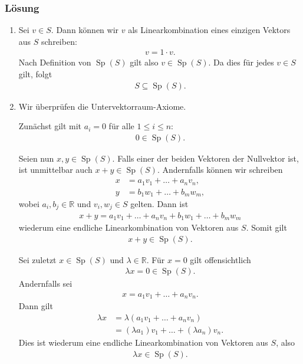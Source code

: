 \documentclass[a4paper,10pt]{article}
\newcommand{\R}{\mathbb{R}}
\newcommand{\Sp}{\operatorname{Sp}}
\newcommand{\s}[1]{#1}
\begin{document}
\s{\subsubsection*{Lösung}

\begin{enumerate}[label=(\alph*)]

    \item
    Sei $v\in S$. Dann können wir $v$ als Linearkombination eines einzigen Vektors aus $S$ schreiben:
    \begin{align*}
        v=1\cdot v.
    \end{align*}
    Nach Definition von $\Sp(S)$ gilt also $v\in\Sp(S)$. Da dies für jedes $v\in S$ gilt, folgt
    \begin{align*}
        S\subseteq\Sp(S).
    \end{align*}

    \item
    Wir überprüfen die Untervektorraum-Axiome.

    Zunächst gilt mit $a_i=0$ für alle $1\leq i\leq n$:
    \begin{align*}
        0\in\Sp(S).
    \end{align*}

    Seien nun $x,y\in\Sp(S)$. Falls einer der beiden Vektoren der Nullvektor ist, ist unmittelbar auch $x+y\in\Sp(S)$. Andernfalls können wir schreiben
    \begin{align*}
        x &= a_1v_1+\ldots+a_nv_n,\\
        y &= b_1w_1+\ldots+b_mw_m,
    \end{align*}
    wobei $a_i,b_j\in\R$ und $v_i,w_j\in S$ gelten. Dann ist
    \begin{align*}
        x+y
        =
        a_1v_1+\ldots+a_nv_n
        +b_1w_1+\ldots+b_mw_m
    \end{align*}
    wiederum eine endliche Linearkombination von Vektoren aus $S$. Somit gilt
    \begin{align*}
        x+y\in\Sp(S).
    \end{align*}

    Sei zuletzt $x\in\Sp(S)$ und $\lambda\in\R$. Für $x=0$ gilt offensichtlich
    \begin{align*}
        \lambda x=0\in\Sp(S).
    \end{align*}
    Andernfalls sei
    \begin{align*}
        x=a_1v_1+\ldots+a_nv_n.
    \end{align*}
    Dann gilt
    \begin{align*}
        \lambda x
        &=
        \lambda(a_1v_1+\ldots+a_nv_n)\\
        &=
        (\lambda a_1)v_1+\ldots+(\lambda a_n)v_n.
    \end{align*}
    Dies ist wiederum eine endliche Linearkombination von Vektoren aus $S$, also
    \begin{align*}
        \lambda x\in\Sp(S).
    \end{align*}


\end{enumerate}}
\end{document}
